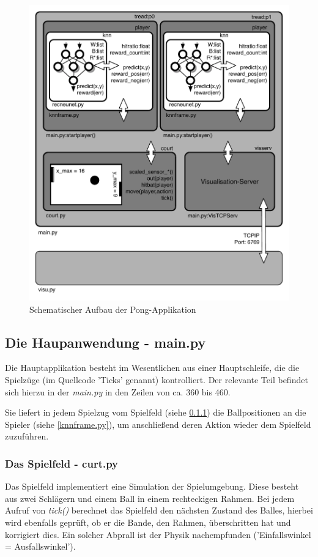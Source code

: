 \documentclass[12pt,twoside]{article}
\theoremstyle{plain}
\theoremstyle{definition}
\theoremstyle{remark}
\begin{document}
\begin{figure}[hbtp]
	 \centerline{\includegraphics[]{ApplicationArchitecture.pdf}}
	 {\caption{Schematischer Aufbau der Pong-Applikation}\label{fig:ApplicationArchitecture}}
\end{figure}


\subsection{Die Haupanwendung - main.py}
\label{main.py}

Die Hauptapplikation besteht im Wesentlichen aus einer Hauptschleife, die die Spielzüge (im Quellcode 'Ticks' genannt) kontrolliert. Der relevante Teil befindet sich hierzu in der \textit{main.py} in den Zeilen von ca. 360 bis 460.

Sie liefert in jedem Spielzug vom Spielfeld (siehe \ref{curt.py}) die Ballpositionen an die Spieler (siehe \ref{knnframe.py}), um anschließend deren Aktion wieder dem Spielfeld zuzuführen.

\subsubsection{Das Spielfeld - curt.py}
\label{curt.py}
Das Spielfeld implementiert eine Simulation der Spielumgebung. Diese besteht aus zwei Schlägern und einem Ball in einem rechteckigen Rahmen. Bei jedem Aufruf von \textit{tick()} berechnet das Spielfeld den nächsten Zustand des Balles, hierbei wird ebenfalls geprüft, ob er die Bande, den Rahmen, überschritten hat und korrigiert dies. Ein solcher Abprall ist der Physik nachempfunden ('Einfallswinkel = Ausfallswinkel').
\end{document}
